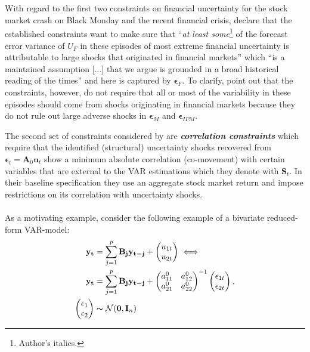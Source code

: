 \documentclass[a4paper,11pt,listof=nochaptergap,oneside,pointednumbers,bibtotoc,bigheadings,liststotoc]{scrbook}
\theoremstyle{mysatz}
\theoremstyle{mydefinition}
\theoremstyle{mytheorem}
\theoremstyle{mybemerkung}
\newcommand{\vect}[1]{\boldsymbol{\mathbf{#1}}}
\begin{document}
\\
\\
With regard to the first two constraints on financial uncertainty for the stock market crash on Black Monday and the recent financial crisis, \citet{ludvigsonetal:18} declare that the established constraints want to make sure that ``\textit{at least some}\footnote{Author's italics.} of the forecast error variance of $U_F$ in these episodes of most extreme financial uncertainty is attributable to large shocks that originated in financial markets'' which ``is a maintained assumption [...] that we argue is grounded in a broad historical reading of the times'' \citep[p. 8]{ludvigsonetal:18} and here is captured by $\vect{\epsilon}_F$. To clarify, \citet{ludvigsonetal:18} point out that the constraints, however, do not require that all or most of the variability in these episodes should come from shocks originating in financial markets because they do not rule out large adverse shocks in $\vect{\epsilon}_M$ and $\vect{\epsilon}_{IPM}$. 




The second set of constraints considered by \citet{ludvigsonetal:18} are \textbf{\textit{correlation constraints}} which require that the identified (structural) uncertainty shocks recovered from $\vect{\epsilon}_t = \vect{A}_0\vect{u}_t$ show a minimum absolute correlation (co-movement) with certain variables that are external to the VAR estimations which they denote with $\vect{S}_t$. In their baseline specification they use an aggregate stock market return and impose restrictions on its correlation with uncertainty shocks. \\
\\
As a motivating example, \citet{ludvigsonetal:17} consider the following example of a bivariate reduced-form VAR-model:
\begin{equation} \label{eq:svar_ludvi12_a}
\begin{split}
	\vect{y_t} & = \sum_{j=1}^{p} \vect{B_j}\vect{y_{t-j}} + 
		\begin{pmatrix}
			u_{1t} \\
			u_{2t}
		\end{pmatrix} \iff \\
\vect{y_t} & = \sum_{j=1}^{p} \vect{B_j}\vect{y_{t-j}} + 	
					\begin{pmatrix}
    			a_{11}^0 &  a_{12}^0 \\
			a_{21}^0 &  a_{22}^0
 			\end{pmatrix}^{-1}
		\begin{pmatrix}
			\epsilon_{1t} \\
			\epsilon_{2t}
		\end{pmatrix},\\
		\begin{pmatrix}
			\epsilon_1 \\
			\epsilon_2
		\end{pmatrix} & \thicksim \mathcal{N}(\vect{0}, \vect{I}_n)
\end{split}								
\end{equation}
\end{document}
